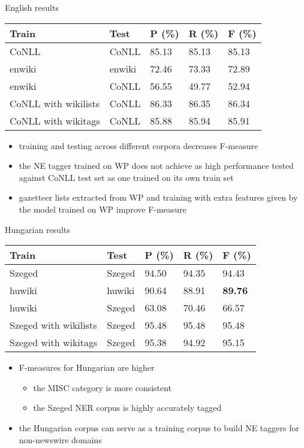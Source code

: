 \documentclass[utf8x,t]{beamer}
\begin{document}
\begin{frame}{English results}

\begin{center}
\begin{tabular}{lllll}
\hline \bf Train & \bf Test & \bf P (\%) & \bf R (\%) & \bf F (\%) \\ \hline
CoNLL & CoNLL & 85.13 & 85.13 & 85.13 \\
enwiki & enwiki & 72.46 & 73.33 &  72.89 \\
enwiki & CoNLL & 56.55 & 49.77 & 52.94 \\
CoNLL with wikilists & CoNLL & 86.33 & 86.35 & 86.34 \\
CoNLL with wikitags & CoNLL & 85.88 & 85.94 & 85.91 \\
\hline
\end{tabular}
\end{center}

\begin{itemize}
\item training and testing across different corpora decreases F-measure
\item the NE tagger trained on WP does not achieve as high performance tested against CoNLL test set as one trained on its own train set
\item gazetteer lists extracted from WP and training with extra features given by the model trained on WP improve F-measure
\end{itemize}

\end{frame}

\begin{frame}{Hungarian results}

\begin{center}
\begin{tabular}{lllll}
\hline \bf Train & \bf Test & \bf P (\%) & \bf R (\%) & \bf F (\%) \\ \hline
Szeged  & Szeged  & 94.50 & 94.35 & 94.43 \\
huwiki & huwiki & 90.64 & 88.91 &  \textbf{89.76} \\
huwiki & Szeged  & 63.08 & 70.46 & 66.57 \\
Szeged  with wikilists & Szeged  & 95.48 & 95.48 & 95.48 \\
Szeged  with wikitags & Szeged  & 95.38 & 94.92 & 95.15 \\
\hline
\end{tabular}
\end{center}

\begin{itemize}
\item F-measures for Hungarian are higher 
\begin{itemize}
\item the MISC category is more consistent
\item the Szeged NER corpus is highly accurately tagged 
\end{itemize}
\item the Hungarian corpus can serve as a training corpus to build NE taggers for non-newswire domains
\end{itemize}

\end{frame}
\end{document}
